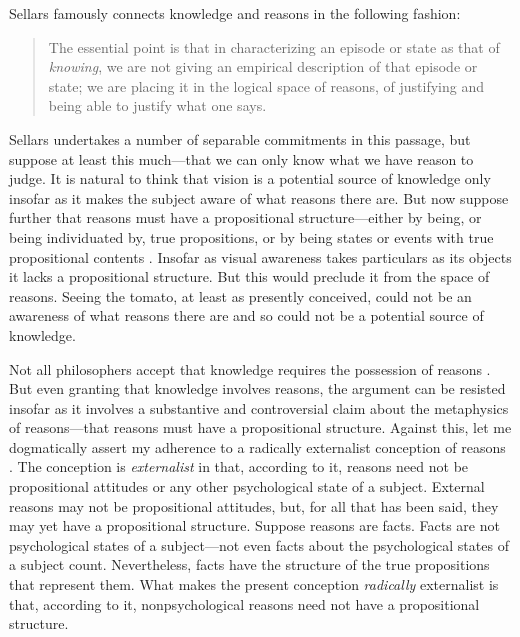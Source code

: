 \documentclass[12pt]{article}
\begin{document}
Sellars famously connects knowledge and reasons in the following fashion:
\begin{quote}
	The essential point is that in characterizing an episode or state as that of \emph{knowing}, we are not giving an empirical description of that episode or state; we are placing it in the logical space of reasons, of justifying and being able to justify what one says. \citep[§36]{Sellars:1956xp}
\end{quote}
Sellars undertakes a number of separable commitments in this passage, but suppose at least this much---that we can only know what we have reason to judge. It is natural to think that vision is a potential source of knowledge only insofar as it makes the subject aware of what reasons there are. But now suppose further that reasons must have a propositional structure---either by being, or being individuated by, true propositions, or by being states or events with true propositional contents \citep[see][141, 143--4]{McDowell:1996uq}. Insofar as visual awareness takes particulars as its objects it lacks a propositional structure. But this would preclude it from the space of reasons. Seeing the tomato, at least as presently conceived, could not be an awareness of what reasons there are and so could not be a potential source of knowledge.

Not all philosophers accept that knowledge requires the possession of reasons \citep[see][for a recent expression of skepticism]{Pryor:2007fk}. But even granting that knowledge involves reasons, the argument can be resisted insofar as it involves a substantive and controversial claim about the metaphysics of reasons---that reasons must have a propositional structure. Against this, let me dogmatically assert my adherence to a radically externalist conception of reasons \citep[see][]{Scanlon:1998hb,Raz:2000tm}. The conception is \emph{externalist} in that, according to it, reasons need not be propositional attitudes or any other psychological state of a subject. External reasons may not be propositional attitudes, but, for all that has been said, they may yet have a propositional structure. Suppose reasons are facts. Facts are not psychological states of a subject---not even facts about the psychological states of a subject count. Nevertheless, facts have the structure of the true propositions that represent them. What makes the present conception \emph{radically} externalist is that, according to it, nonpsychological reasons need not have a propositional structure.
\end{document}
